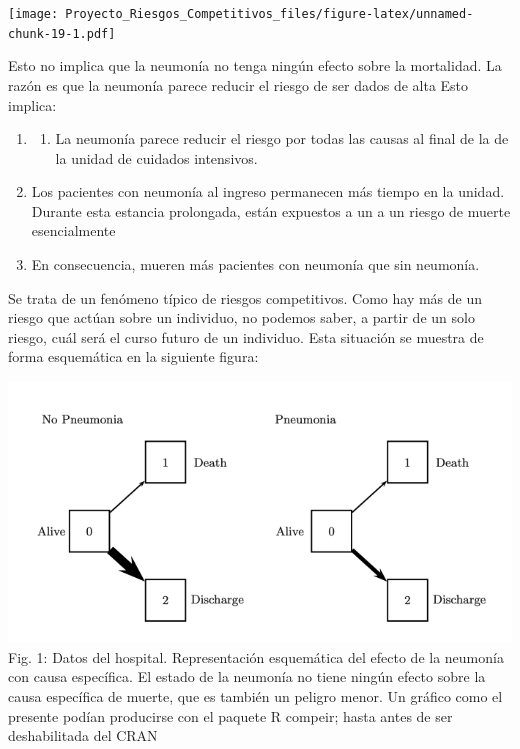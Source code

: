 \documentclass[
]{article}
\providecommand{\tightlist}{%
  \setlength{\itemsep}{0pt}\setlength{\parskip}{0pt}}
\begin{document}
\texttt{[image: Proyecto\_Riesgos\_Competitivos\_files/figure-latex/unnamed-chunk-19-1.pdf]}

Esto no implica que la neumonía no tenga ningún efecto sobre la
mortalidad. La razón es que la neumonía parece reducir el riesgo de ser
dados de alta Esto implica:

\begin{enumerate}
\def\labelenumi{\arabic{enumi}.}
\item
  \begin{enumerate}
  \def\labelenumii{\arabic{enumii}.}
  \tightlist
  \item
    La neumonía parece reducir el riesgo por todas las causas al final
    de la de la unidad de cuidados intensivos.
  \end{enumerate}
\item
  Los pacientes con neumonía al ingreso permanecen más tiempo en la
  unidad. Durante esta estancia prolongada, están expuestos a un a un
  riesgo de muerte esencialmente
\item
  En consecuencia, mueren más pacientes con neumonía que sin neumonía.
\end{enumerate}

Se trata de un fenómeno típico de riesgos competitivos. Como hay más de
un riesgo que actúan sobre un individuo, no podemos saber, a partir de
un solo riesgo, cuál será el curso futuro de un individuo. Esta
situación se muestra de forma esquemática en la siguiente figura:

\includegraphics[width=1\linewidth]{pic_1} Fig. 1: Datos del hospital.
Representación esquemática del efecto de la neumonía con causa
específica. El estado de la neumonía no tiene ningún efecto sobre la
causa específica de muerte, que es también un peligro menor. Un gráfico
como el presente podían producirse con el paquete R compeir; hasta antes
de ser deshabilitada del CRAN
\end{document}
